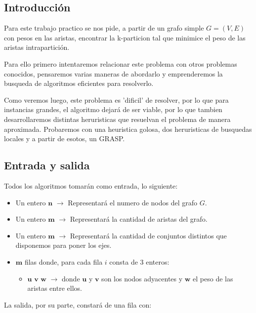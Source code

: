 \subsection{Introducción}

Para este trabajo practico se nos pide, a partir de un grafo simple $G=(V,E)$ con pesos en las aristas, encontrar la k-particion tal que minimice el peso de las aristas intrapartición.

Para ello primero intentaremos relacionar este problema con otros problemas conocidos, pensaremos varias maneras de abordarlo y emprenderemos la busqueda de algoritmos eficientes para resolverlo.

Como veremos luego, este problema es 'dificil' de resolver, por lo que para instancias grandes, el algoritmo dejará de ser viable, por lo que tambien desarrollaremos distintas heruristicas que resuelvan el problema de manera aproximada. Probaremos con una heuristica golosa, dos heruristicas de busquedas locales y a partir de esotos, un GRASP.

\subsection{Entrada y salida}

Todos los algoritmos tomarán como entrada, lo siguiente:

\begin{itemize}
	\item Un entero $\textbf{n}$ $\rightarrow$ Representará el numero de nodos del grafo $G$.

	\item Un entero $\textbf{m}$ $\rightarrow$ Representará la cantidad de aristas del grafo.

	\item Un entero $\textbf{m}$ $\rightarrow$ Representará la cantidad de conjuntos distintos que disponemos para poner los ejes.

	\item $\textbf{m}$ filas donde, para cada fila $i$ consta de $3$ enteros:
	\begin{itemize}
		\item $\textbf{u v w}$ $ \rightarrow $ donde $\textbf{u}$ y $\textbf{v}$ son los nodos adyacentes y $\textbf{w}$ el peso de las aristas entre ellos.
	\end{itemize}
\end{itemize}

La salida, por su parte, constar\'a de una fila con:

